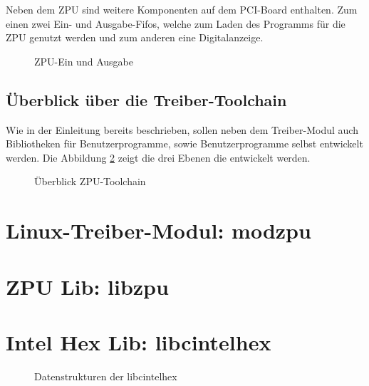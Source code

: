 \documentclass[12pt]{scrartcl}
\begin{document}
Neben dem ZPU sind weitere Komponenten auf dem PCI-Board enthalten. Zum einen zwei Ein- und Ausgabe-Fifos, welche zum Laden des Programms für die ZPU genutzt werden und zum anderen eine Digitalanzeige. 
\begin{figure}[!htb]
	\begin{center}
		
		\caption{ZPU-Ein und Ausgabe}
		\label{zpu_io}
	\end{center}
\end{figure}


\subsection{Überblick über die Treiber-Toolchain}
Wie in der Einleitung bereits beschrieben, sollen neben dem Treiber-Modul auch Bibliotheken für Benutzerprogramme, sowie Benutzerprogramme selbst entwickelt werden. Die Abbildung \ref{zpu_architecture} zeigt die drei Ebenen die entwickelt werden. 

\begin{figure}[!htb]
	\begin{center}
		
		\caption{Überblick ZPU-Toolchain}
		\label{zpu_architecture}	
	\end{center}
\end{figure}


\section{Linux-Treiber-Modul: modzpu}

\section{ZPU Lib: libzpu}
\section{Intel Hex Lib: libcintelhex}

\begin{figure}[!htb]
	
	\caption{Datenstrukturen der libcintelhex}
	\label{lcih_datastructs}
\end{figure}

\pagebreak %

\fancyhead[R]{}

\thispagestyle{empty}

\renewcommand*{\biburlprefix}{(URL: }
\renewcommand*{\biburlsuffix}{)}

\pagebreak
{} %


\appendix
\end{document}
